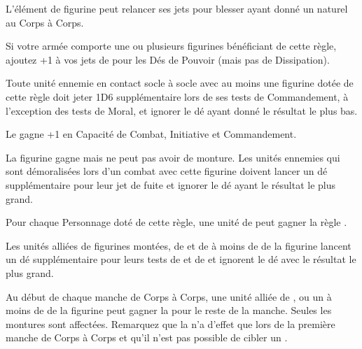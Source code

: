 

\startarmyspecialrules

\armyspecialruleentry{\killerinstinct}

L'élément de figurine peut relancer ses jets pour blesser ayant donné un  naturel au Corps à Corps.

\armyspecialruleentry{\masterofthedarkarts}

Si votre armée comporte une ou plusieurs figurines bénéficiant de cette règle, ajoutez +1 à vos jets de \channel{} pour les Dés de Pouvoir (mais pas de Dissipation).

\armyspecialruleentry{\auraofdespair}

Toute unité ennemie en contact socle à socle avec au moins une figurine dotée de cette règle doit jeter 1D6 supplémentaire lors de ses tests de Commandement, à l'exception des tests de Moral, et ignorer le dé ayant donné le résultat le plus bas.

\armyspecialruleentry{\alphapredator}

Le \monster{} gagne +1 en Capacité de Combat, Initiative et Commandement.

\begin{multicols}{2}\raggedcolumns
\armyspecialruleentry{\fleetcommander}

La figurine gagne  mais ne peut pas avoir de monture. Les unités ennemies qui sont démoralisées lors d'un combat avec cette figurine doivent lancer un dé supplémentaire pour leur jet de fuite et ignorer le dé ayant le résultat le plus grand.

Pour chaque Personnage doté de cette règle, une unité de \corsairs{} peut gagner la règle \vanguard{}.

\columnbreak
\armyspecialruleentry{\beastmaster}

Les unités alliées de figurines montées, de \monsters{} et de \warbeasts{} à moins de  de la figurine lancent un dé supplémentaire pour leurs tests de \frenzy{} et de \stupidity{} et ignorent le dé avec le résultat le plus grand.

Au début de chaque manche de Corps à Corps, une unité alliée de \cavalry{}, \monstrouscavalry{} ou un \monster{} à moins de  de la figurine peut gagner la \hatred{} pour le reste de la manche. Seules les montures sont affectées. Remarquez que la \hatred{} n'a d'effet que lors de la première manche de Corps à Corps et qu'il n'est pas possible de cibler un \riddenmonster{}.

\end{multicols}

